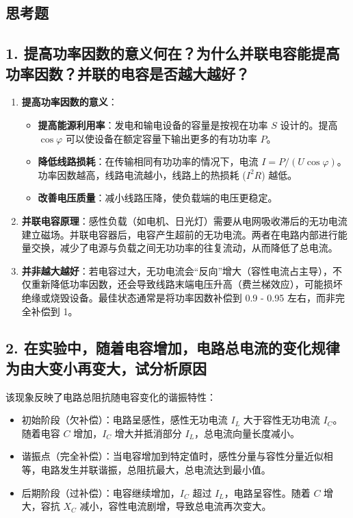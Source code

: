 \documentclass[]{../template/Report}%
\begin{document}
\begin{fullreportonly}
    \section{思考题}

    \subsection*{1. 提高功率因数的意义何在？为什么并联电容能提高功率因数？并联的电容是否越大越好？}
    \begin{enumerate}
        \item \textbf{提高功率因数的意义}：
              \begin{itemize}
                  \item \textbf{提高能源利用率}：发电和输电设备的容量是按视在功率 $S$ 设计的。提高 $\cos\varphi$ 可以使设备在额定容量下输出更多的有功功率 $P$。
                  \item \textbf{降低线路损耗}：在传输相同有功功率的情况下，电流 $I = P/(U\cos\varphi)$。功率因数越高，线路电流越小，线路上的热损耗 ($I^2R$) 越低。
                  \item \textbf{改善电压质量}：减小线路压降，使负载端的电压更稳定。
              \end{itemize}
        \item \textbf{并联电容原理}：感性负载（如电机、日光灯）需要从电网吸收滞后的无功电流建立磁场。并联电容器后，电容产生超前的无功电流。两者在电路内部进行能量交换，减少了电源与负载之间无功功率的往复流动，从而降低了总电流。
        \item \textbf{并非越大越好}：若电容过大，无功电流会“反向”增大（容性电流占主导），不仅重新降低功率因数，还会导致线路末端电压升高（费兰梯效应），可能损坏绝缘或烧毁设备。最佳状态通常是将功率因数补偿到 0.9 - 0.95 左右，而非完全补偿到 1。
    \end{enumerate}

    \subsection*{2. 在实验中，随着电容增加，电路总电流的变化规律为由大变小再变大，试分析原因}
    该现象反映了电路总阻抗随电容变化的谐振特性：
    \begin{itemize}
        \item 初始阶段（欠补偿）：电路呈感性，感性无功电流 $I_L$ 大于容性无功电流 $I_C$。随着电容 $C$ 增加，$I_C$ 增大并抵消部分 $I_L$，总电流向量长度减小。
        \item 谐振点（完全补偿）：当电容增加到特定值时，感性分量与容性分量近似相等，电路发生并联谐振，总阻抗最大，总电流达到最小值。
        \item 后期阶段（过补偿）：电容继续增加，$I_C$ 超过 $I_L$，电路呈容性。随着 $C$ 增大，容抗 $X_C$ 减小，容性电流剧增，导致总电流再次变大。
    \end{itemize}


\end{fullreportonly}
\end{document}
